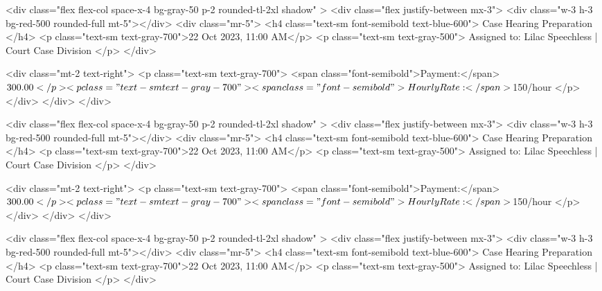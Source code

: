               <div
                class="flex flex-col space-x-4 bg-gray-50 p-2 rounded-tl-2xl shadow"
              >
                <div class="flex justify-between mx-3">
                  <div class="w-3 h-3 bg-red-500 rounded-full mt-5"></div>
                  <div class="mr-5">
                    <h4 class="text-sm font-semibold text-blue-600">
                      Case Hearing Preparation
                    </h4>
                    <p class="text-sm text-gray-700">22 Oct 2023, 11:00 AM</p>
                    <p class="text-sm text-gray-500">
                      Assigned to: Lilac Speechless | Court Case Division
                    </p>
                  </div>

                  <div class="mt-2 text-right">
                    <p class="text-sm text-gray-700">
                      <span class="font-semibold">Payment:</span> $300.00
                    </p>
                    <p class="text-sm text-gray-700">
                      <span class="font-semibold">Hourly Rate:</span> $150/hour
                    </p>
                  </div>
                </div>
              </div>

              <div
                class="flex flex-col space-x-4 bg-gray-50 p-2 rounded-tl-2xl shadow"
              >
                <div class="flex justify-between mx-3">
                  <div class="w-3 h-3 bg-red-500 rounded-full mt-5"></div>
                  <div class="mr-5">
                    <h4 class="text-sm font-semibold text-blue-600">
                      Case Hearing Preparation
                    </h4>
                    <p class="text-sm text-gray-700">22 Oct 2023, 11:00 AM</p>
                    <p class="text-sm text-gray-500">
                      Assigned to: Lilac Speechless | Court Case Division
                    </p>
                  </div>

                  <div class="mt-2 text-right">
                    <p class="text-sm text-gray-700">
                      <span class="font-semibold">Payment:</span> $300.00
                    </p>
                    <p class="text-sm text-gray-700">
                      <span class="font-semibold">Hourly Rate:</span> $150/hour
                    </p>
                  </div>
                </div>
              </div>

              <div
                class="flex flex-col space-x-4 bg-gray-50 p-2 rounded-tl-2xl shadow"
              >
                <div class="flex justify-between mx-3">
                  <div class="w-3 h-3 bg-red-500 rounded-full mt-5"></div>
                  <div class="mr-5">
                    <h4 class="text-sm font-semibold text-blue-600">
                      Case Hearing Preparation
                    </h4>
                    <p class="text-sm text-gray-700">22 Oct 2023, 11:00 AM</p>
                    <p class="text-sm text-gray-500">
                      Assigned to: Lilac Speechless | Court Case Division
                    </p>
                  </div>

